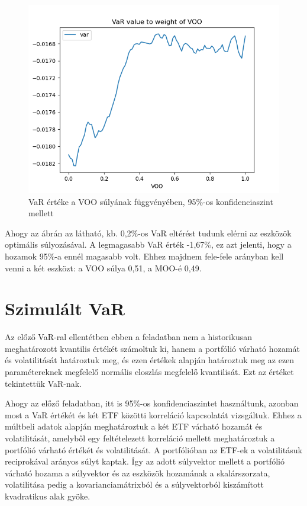 \documentclass[12pt]{article}
\begin{document}
\begin{figure}[H]
	\centering
	\includegraphics[scale=0.9]{var}
	\caption{VaR értéke a VOO súlyának függvényében, 95\%-os konfidenciaszint mellett}
\end{figure}

Ahogy az ábrán az látható, kb. 0,2\%-os VaR eltérést tudunk elérni az eszközök optimális súlyozásával. A legmagasabb VaR érték -1,67\%, ez azt jelenti, hogy a hozamok 95\%-a ennél magasabb volt. Ehhez majdnem fele-fele arányban kell venni a két eszközt: a VOO súlya 0,51, a MOO-é 0,49.



\section{Szimulált VaR}

Az előző VaR-ral ellentétben ebben a feladatban nem a historikusan meghatározott kvantilis értékét számoltuk ki, hanem a portfólió várható hozamát és volatilitását határoztuk meg, és ezen értékek alapján határoztuk meg az ezen paramétereknek megfelelő normális eloszlás megfelelő kvantilisát. Ezt az értéket tekintettük VaR-nak.

Ahogy az előző feladatban, itt is 95\%-os konfidenciaszintet használtunk, azonban most a VaR értékét és két ETF közötti korreláció kapcsolatát vizsgáltuk. Ehhez a múltbeli adatok alapján meghatároztuk a két ETF várható hozamát és volatilitását, amelyből egy feltételezett korreláció mellett meghatároztuk a portfólió várható értékét és volatilitását. A portfólióban az ETF-ek a volatilitásuk reciprokával arányos súlyt kaptak. Így az adott súlyvektor mellett a portfólió várható hozama a súlyvektor és az eszközök hozamának a skalárszorzata, volatilitása pedig a kovarianciamátrixból és a súlyvektorból kiszámított kvadratikus alak gyöke.
\end{document}
